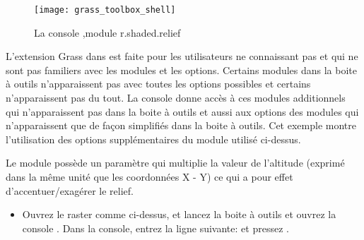 {%
\begin{figure}[ht]
 \begin{center}

 \texttt{[image: grass\_toolbox\_shell]}
 \caption{La console \grass,module r.shaded.relief \nixcaption}\label{fig:grass_toolbox_shell}
 \end{center}
\end{figure}
L'extension Grass dans \qg est faite pour les utilisateurs ne connaissant pas \grass et qui ne sont pas familiers avec les modules et les options.
Certains modules dans la boite à outils n'apparaissent pas avec toutes les options possibles et certains n'apparaissent pas du tout. La console \grass donne accès à ces modules additionnels qui n'apparaissent pas dans la boite à outils et aussi aux options des modules qui n'apparaissent que de façon simplifiés dans la boite à outils. Cet exemple montre l'utilisation des options supplémentaires du module  utilisé ci-dessus.



Le module  possède un paramètre  qui multiplie la valeur de l'altitude (exprimé dans la même unité que les coordonnées X - Y) ce qui a pour effet d'accentuer/exagérer le relief.

\begin{itemize}[label=--]
\item Ouvrez le raster  comme ci-dessus, et lancez la boite à outils \grass et ouvrez la console \grass. Dans la console, entrez la ligne suivante:\linebreak {} \linebreak et pressez .


\end{itemize}}
